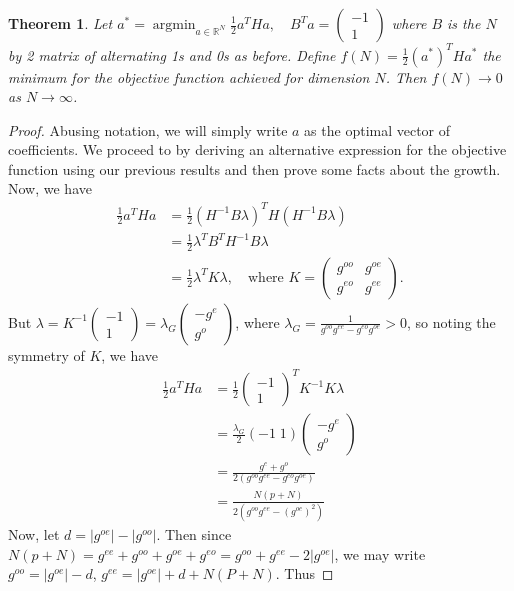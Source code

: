 \documentclass[11pt]{article}
\newtheorem{thm}{Theorem}[section]
\theoremstyle{definition}
\theoremstyle{remark}
\numberwithin{equation}{section}
\DeclareMathOperator{\argmin}{argmin}
\begin{document}
\begin{thm}
Let $a^* = \argmin_{a\in\mathbb{R}^N} \frac{1}{2} a^T H a, \quad B^Ta = \begin{pmatrix} -1 \\ 1 \end{pmatrix}$ where $B$ is the $N$ by 2 matrix of alternating 1s and 0s as before. Define $f(N) = \frac{1}{2}(a^*)^T H a^*$ the minimum for the objective function achieved for dimension $N$. Then $f(N) \to 0$ as $N\to \infty$.
\end{thm}
\begin{proof}
Abusing notation, we will simply write $a$ as the optimal vector of coefficients. We proceed to by deriving an alternative expression for the objective function using our previous results and then prove some facts about the growth. Now, we have
\begin{align*}
\frac{1}{2}a^T Ha &= \frac{1}{2}(H^{-1}B \lambda)^TH(H^{-1}B \lambda) \\
&= \frac{1}{2} \lambda^T B^T H^{-1}B \lambda \\
&= \frac{1}{2} \lambda^T K\lambda, \quad \text{where } K= \begin{pmatrix} g^{oo} & g^{oe} \\
g^{eo} & g^{ee} \end{pmatrix}.
\end{align*} But $\lambda = K^{-1} \begin{pmatrix} -1 \\ 1 \end{pmatrix} = \lambda_G \begin{pmatrix} -g^e \\ g^o \end{pmatrix}$, where $\lambda_G = \frac{1}{g^{oo} g^{ee} - g^{eo}g^{oe}} >0$, so noting the symmetry of $K$, we have 
\begin{align*}
\frac{1}{2} a^T Ha &= \frac{1}{2}\begin{pmatrix} -1 \\ 1\end{pmatrix} ^T K^{-1} K \lambda \\ 
&= \frac{\lambda_G}{2}(-1 \; 1) \begin{pmatrix} -g^e \\ g^o \end{pmatrix}\\
&= \frac{g^e + g^o}{2(g^{oo} g^{ee} - g^{eo}g^{oe})}\\
&= \frac{N(p+N)}{2(g^{oo}g^{ee} - (g^{oe})^2)}
\end{align*}
Now, let $d=|g^{oe}| - |g^{oo}|$. Then since $N(p+N) = g^{ee} + g^{oo} + g^{oe} + g^{eo} = g^{oo}+g^{ee} - 2|g^{oe}|$, we may write $g^{oo} = |g^{oe}|-d$, $g^{ee} = |g^{oe}| + d + N(P+N)$. Thus 

\end{proof}
\end{document}
